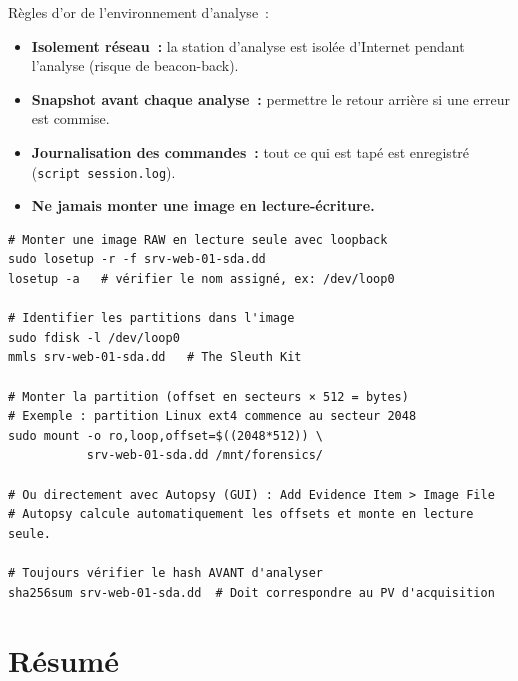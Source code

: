 Règles d'or de l'environnement d'analyse~:
\begin{itemize}
  \item \textbf{Isolement réseau~:} la station d'analyse est isolée
        d'Internet pendant l'analyse (risque de beacon-back).
  \item \textbf{Snapshot avant chaque analyse~:} permettre le retour
        arrière si une erreur est commise.
  \item \textbf{Journalisation des commandes~:} tout ce qui est tapé
        est enregistré (\texttt{script session.log}).
  \item \textbf{Ne jamais monter une image en lecture-écriture.}
\end{itemize}

\begin{lstlisting}[style=StyleTerminal,
  caption={Montage d'une image disque en lecture seule (SIFT)},
  label={lst:mount-image}]
# Monter une image RAW en lecture seule avec loopback
sudo losetup -r -f srv-web-01-sda.dd
losetup -a   # vérifier le nom assigné, ex: /dev/loop0

# Identifier les partitions dans l'image
sudo fdisk -l /dev/loop0
mmls srv-web-01-sda.dd   # The Sleuth Kit

# Monter la partition (offset en secteurs × 512 = bytes)
# Exemple : partition Linux ext4 commence au secteur 2048
sudo mount -o ro,loop,offset=$((2048*512)) \
           srv-web-01-sda.dd /mnt/forensics/

# Ou directement avec Autopsy (GUI) : Add Evidence Item > Image File
# Autopsy calcule automatiquement les offsets et monte en lecture seule.

# Toujours vérifier le hash AVANT d'analyser
sha256sum srv-web-01-sda.dd  # Doit correspondre au PV d'acquisition
\end{lstlisting}

\section*{Résumé}

